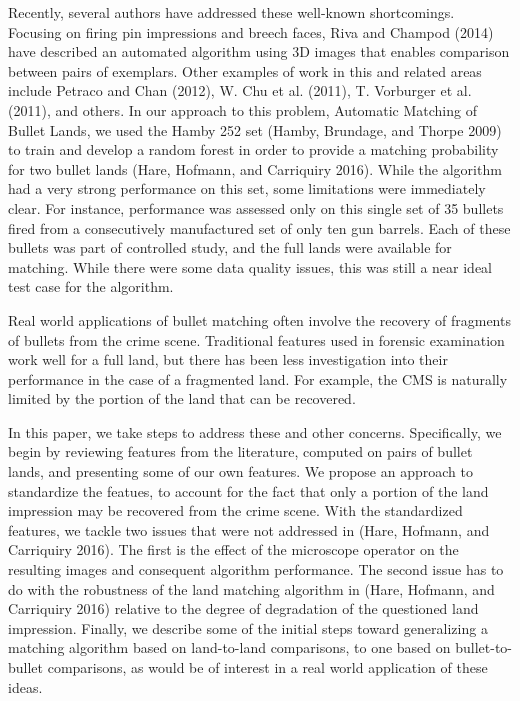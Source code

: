 \documentclass[12pt,]{article}
\theoremstyle{definition}
\theoremstyle{definition}
\theoremstyle{definition}
\theoremstyle{remark}
\begin{document}
Recently, several authors have addressed these well-known shortcomings.
Focusing on firing pin impressions and breech faces, Riva and Champod
(2014) have described an automated algorithm using 3D images that
enables comparison between pairs of exemplars. Other examples of work in
this and related areas include Petraco and Chan (2012), W. Chu et al.
(2011), T. Vorburger et al. (2011), and others. In our approach to this
problem, Automatic Matching of Bullet Lands, we used the Hamby 252 set
(Hamby, Brundage, and Thorpe 2009) to train and develop a random forest
in order to provide a matching probability for two bullet lands (Hare,
Hofmann, and Carriquiry 2016). While the algorithm had a very strong
performance on this set, some limitations were immediately clear. For
instance, performance was assessed only on this single set of 35 bullets
fired from a consecutively manufactured set of only ten gun barrels.
Each of these bullets was part of controlled study, and the full lands
were available for matching. While there were some data quality issues,
this was still a near ideal test case for the algorithm.

Real world applications of bullet matching often involve the recovery of
fragments of bullets from the crime scene. Traditional features used in
forensic examination work well for a full land, but there has been less
investigation into their performance in the case of a fragmented land.
For example, the CMS is naturally limited by the portion of the land
that can be recovered.

In this paper, we take steps to address these and other concerns.
Specifically, we begin by reviewing features from the literature,
computed on pairs of bullet lands, and presenting some of our own
features. We propose an approach to standardize the featues, to account
for the fact that only a portion of the land impression may be recovered
from the crime scene. With the standardized features, we tackle two
issues that were not addressed in (Hare, Hofmann, and Carriquiry 2016).
The first is the effect of the microscope operator on the resulting
images and consequent algorithm performance. The second issue has to do
with the robustness of the land matching algorithm in (Hare, Hofmann,
and Carriquiry 2016) relative to the degree of degradation of the
questioned land impression. Finally, we describe some of the initial
steps toward generalizing a matching algorithm based on land-to-land
comparisons, to one based on bullet-to-bullet comparisons, as would be
of interest in a real world application of these ideas.
\end{document}
